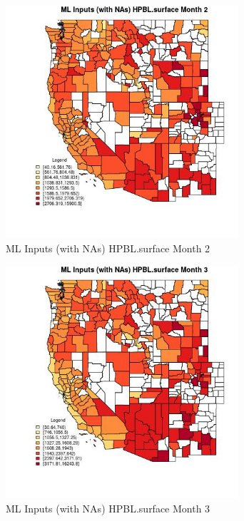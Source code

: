\begin{figure} 
\centering  
\includegraphics[width=0.77\textwidth]{Code_Outputs/Report_ML_input_PM25_Step4_part_f_de_duplicated_aveswNAs_CountyHPBLsurfacemedianMonth2.jpg} 
\caption{\label{fig:Report_ML_input_PM25_Step4_part_f_de_duplicated_aveswNAsCountyHPBLsurfacemedianMonth2}ML Inputs (with NAs) HPBL.surface Month 2} 
\end{figure} 
 

\begin{figure} 
\centering  
\includegraphics[width=0.77\textwidth]{Code_Outputs/Report_ML_input_PM25_Step4_part_f_de_duplicated_aveswNAs_CountyHPBLsurfacemedianMonth3.jpg} 
\caption{\label{fig:Report_ML_input_PM25_Step4_part_f_de_duplicated_aveswNAsCountyHPBLsurfacemedianMonth3}ML Inputs (with NAs) HPBL.surface Month 3} 
\end{figure} 
 

